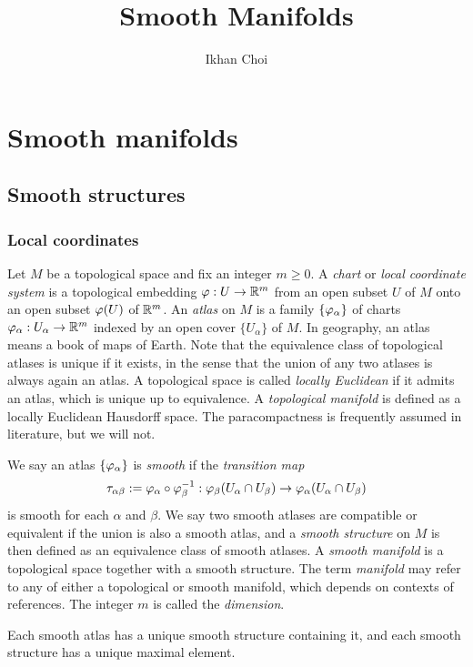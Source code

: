 \documentclass{../../large}
\begin{document}
\title{Smooth Manifolds}
\author{Ikhan Choi}
\maketitle
\tableofcontents





\part{Smooth manifolds}


\chapter{Smooth structures}

\section{Local coordinates}


\begin{prb}[Atlases]
Let $M$ be a topological space and fix an integer $m\ge0$.
A \emph{chart} or \emph{local coordinate system} is a topological embedding $\varphi:U\to\mathbb{R}^m$ from an open subset $U$ of $M$ onto an open subset $\varphi(U)$ of $\mathbb{R}^m$.
An \emph{atlas} on $M$ is a family $\{\varphi_\alpha\}$ of charts $\varphi_\alpha:U_\alpha\to\mathbb{R}^m$ indexed by an open cover $\{U_\alpha\}$ of $M$.
In geography, an atlas means a book of maps of Earth.
Note that the equivalence class of topological atlases is unique if it exists, in the sense that the union of any two atlases is always again an atlas.
A topological space is called \emph{locally Euclidean} if it admits an atlas, which is unique up to equivalence.
A \emph{topological manifold} is defined as a locally Euclidean Hausdorff space.
The paracompactness is frequently assumed in literature, but we will not.

We say an atlas $\{\varphi_\alpha\}$ is \emph{smooth} if the \emph{transition map}
\[\tau_{\alpha\beta}:=\varphi_\alpha\circ\varphi_\beta^{-1}:\varphi_\beta(U_\alpha\cap U_\beta)\to\varphi_\alpha(U_\alpha\cap U_\beta)\]
is smooth for each $\alpha$ and $\beta$.
We say two smooth atlases are compatible or equivalent if the union is also a smooth atlas, and a \emph{smooth structure} on $M$ is then defined as an equivalence class of smooth atlases.
A \emph{smooth manifold} is a topological space together with a smooth structure.
The term \emph{manifold} may refer to any of either a topological or smooth manifold, which depends on contexts of references.
The integer $m$ is called the \emph{dimension}.
\begin{parts}
\item Each smooth atlas has a unique smooth structure containing it, and each smooth structure has a unique maximal element.
\end{parts}
\end{prb}
\end{document}
